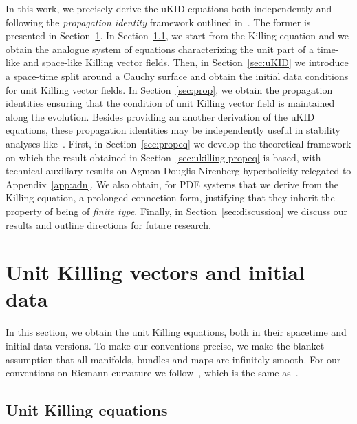 \documentclass[a4paper]{article}
\theoremstyle{remark}
\begin{document}
In this work, we precisely derive the uKID equations both independently
and following the \emph{propagation identity} framework outlined
in~\cite{khgp-ckid, khgp-cykid}. The former is presented in
Section~\ref{sec:killing}. In Section~\ref{sec:ukilling}, we start from
the Killing equation and we obtain the analogue system of equations
characterizing the unit part of a time-like and space-like Killing
vector fields. Then, in Section~\ref{sec:uKID} we introduce a space-time
split around a Cauchy surface and obtain the initial data conditions for
unit Killing vector fields. In Section~\ref{sec:prop}, we obtain the
propagation identities ensuring that the condition of unit Killing
vector field is maintained along the evolution. Besides providing an
another derivation of the uKID equations, these propagation identities
may be independently useful in stability analyses
like~\cite{Ionescu-Klainerman}. First, in Section~\ref{sec:propeq} we
develop the theoretical framework on which the result obtained in
Section~\ref{sec:ukilling-propeq} is based, with technical auxiliary
results on Agmon-Douglis-Nirenberg hyperbolicity relegated to
Appendix~\ref{app:adn}. We also obtain, for PDE systems that we derive
from the Killing equation, a prolonged connection form, justifying that
they inherit the property of being of \emph{finite type}. Finally, in
Section~\ref{sec:discussion} we discuss our results and outline
directions for future research.

\section{Unit Killing vectors and initial data} \label{sec:killing}

In this section, we obtain the unit Killing equations, both in their
spacetime and initial data versions. To make our conventions precise,
we make the blanket assumption that all manifolds, bundles and maps are
infinitely smooth. For our conventions on Riemann curvature we
follow~\cite{XACT}, which is the same as~\cite{wald-gr}.

\subsection{Unit Killing equations} \label{sec:ukilling}
\end{document}
